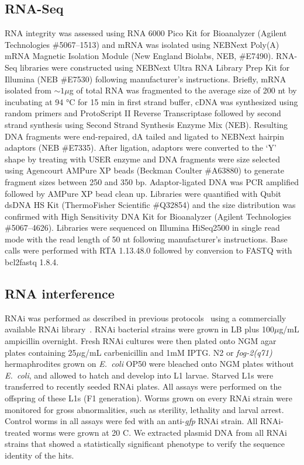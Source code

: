 \documentclass[10pt,letterpaper,twocolumn]{article}
\newcommand{\fog}{\emph{\mbox{fog-2}}}
\newcommand{\ecol}{\emph{E.~coli}}
\begin{document}
\subsection*{RNA-Seq}
\label{sb:rna_seq}
RNA integrity was assessed using RNA 6000 Pico Kit for Bioanalyzer (Agilent Technologies \#5067--1513) and mRNA was isolated using NEBNext Poly(A) mRNA Magnetic Isolation Module (New England Biolabs, NEB, \#E7490). RNA-Seq libraries were constructed using NEBNext Ultra RNA Library Prep Kit for Illumina (NEB \#E7530) following manufacturer’s instructions. Briefly, mRNA isolated from $\sim1\mu$g of total RNA was fragmented to the average size of 200 nt by incubating at 94 °C for 15 min in first strand buffer, cDNA was synthesized using random primers and ProtoScript II Reverse Transcriptase followed by second strand synthesis using Second Strand Synthesis Enzyme Mix (NEB). Resulting DNA fragments were end-repaired, dA tailed and ligated to NEBNext hairpin adaptors (NEB \#E7335).
After ligation, adaptors were converted to the ‘Y’ shape by treating with USER enzyme and DNA fragments were size selected using Agencourt AMPure XP beads (Beckman Coulter \#A63880) to generate fragment sizes between 250 and 350 bp. Adaptor-ligated DNA was PCR amplified followed by AMPure XP bead clean up. Libraries were quantified with Qubit dsDNA HS Kit (ThermoFisher Scientific \#Q32854) and the size distribution was confirmed with High Sensitivity DNA Kit for Bioanalyzer (Agilent Technologies \#5067--4626).
Libraries were sequenced on Illumina HiSeq2500 in single read mode with the read length of 50 nt following manufacturer's instructions. Base calls were performed with RTA 1.13.48.0 followed by conversion to FASTQ with bcl2fastq 1.8.4.


\subsection*{RNA interference}
\label{sb:rnai}
RNAi was performed as described in previous protocols~\cite{Kamath2001} using a commercially available RNAi library~\cite{Kamath2003}. RNAi bacterial strains were grown in LB plus 100$\mu$g/mL ampicillin overnight. Fresh RNAi cultures were then plated onto NGM agar plates containing 25$\mu$g/mL carbenicillin and 1mM IPTG\@. N2 or \fog{}\emph{(q71)} hermaphrodites grown on \ecol{} OP50 were bleached onto NGM plates without \ecol{}, and allowed to hatch and develop into L1 larvae. Starved L1s were transferred to recently seeded RNAi plates.
All assays were performed on the offspring of these L1s (F1 generation). Worms grown on every RNAi strain were monitored for gross abnormalities, such as sterility, lethality and larval arrest. Control worms in all assays were fed with an \mbox{anti-\emph{gfp}} RNAi strain. All RNAi-treated worms were grown at 20\degree{} C. We extracted plasmid DNA from all RNAi strains that showed a statistically significant phenotype to verify the sequence identity of the hits.
\end{document}
